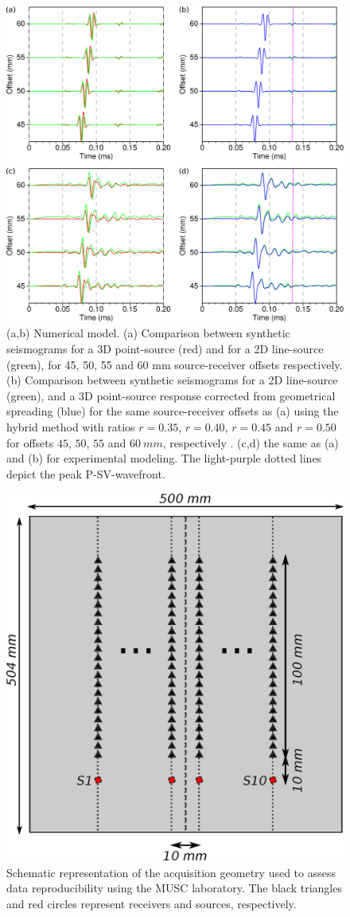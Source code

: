 \documentclass[extra,mreferee]{gji}
\begin{document}
\begin{figure}
\centering
\includegraphics[width=1.0\columnwidth]{Fig/Fig06.eps}
\caption{(a,b) Numerical model. (a) Comparison between synthetic seismograms for a 3D point-source (red) and for a 2D line-source (green), for 45, 50, 55 and 60 mm source-receiver offsets respectively. (b) Comparison between synthetic seismograms for a 2D line-source (green), and a 3D point-source response corrected from geometrical spreading (blue) for the same source-receiver offsets as (a) using the hybrid method with ratios $r=0.35$, $r=0.40$, $r=0.45$ and $r=0.50$ for offsets $45$, $50$, $55$ and $60\ mm$, respectively . (c,d) the same as (a) and (b) for experimental modeling. The light-purple dotted lines depict the peak P-SV-wavefront.}%
\label{Fig:Fig07}
\end{figure}

\clearpage
\newpage

\begin{figure}
\centering
\includegraphics[width=0.50\columnwidth]{Fig/Fig07.eps}
\caption{Schematic representation of the acquisition geometry used to assess data reproducibility using the MUSC laboratory. The black triangles and red circles represent receivers and sources, respectively.}
\label{Fig:Fig08}
\end{figure}
\end{document}
